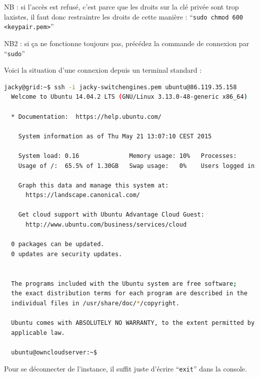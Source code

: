 NB : si l'accès est refusé, c'est parce que les droits sur la clé privée sont trop laxistes, il faut donc restraintre les droits de cette manière : ``\texttt{sudo chmod 600 <keypair.pem>}'' 

NB2 : si ça ne fonctionne toujours pas, précédez la commande de connexion par ``\texttt{sudo}''

\vspace{0.6cm}
Voici la situation d'une connexion depuis un terminal standard :

\vspace{0.4cm}
\begin{lstlisting}[language=bash]
  jacky@grid:~$ ssh -i jacky-switchengines.pem ubuntu@86.119.35.158 
  Welcome to Ubuntu 14.04.2 LTS (GNU/Linux 3.13.0-48-generic x86_64)

  * Documentation:  https://help.ubuntu.com/

    System information as of Thu May 21 13:07:10 CEST 2015

    System load: 0.16              Memory usage: 10%   Processes:       51
    Usage of /:  65.5% of 1.30GB   Swap usage:   0%    Users logged in: 0

    Graph this data and manage this system at:
      https://landscape.canonical.com/

    Get cloud support with Ubuntu Advantage Cloud Guest:
      http://www.ubuntu.com/business/services/cloud

  0 packages can be updated.
  0 updates are security updates.


  The programs included with the Ubuntu system are free software;
  the exact distribution terms for each program are described in the
  individual files in /usr/share/doc/*/copyright.

  Ubuntu comes with ABSOLUTELY NO WARRANTY, to the extent permitted by
  applicable law.

  ubuntu@owncloudserver:~$
\end{lstlisting}

Pour se déconnecter de l'instance, il suffit juste d'écrire ``\texttt{exit}'' dans la console.

